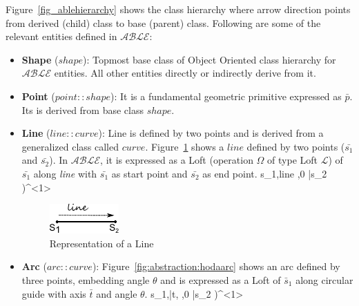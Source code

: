 Figure~\ref{fig_ablehierarchy} shows the class hierarchy where arrow direction points from derived (child) class to base (parent) class.
Following are some of the relevant entities defined in $\mathcal{ABLE}$:

\begin{itemize}[noitemsep,topsep=2pt,parsep=2pt,partopsep=2pt]

\item {\bf Shape} ($shape$): Topmost base class of Object Oriented class hierarchy for $\mathcal{ABLE}$ entities. All other entities directly or indirectly derive from it. 


\item {\bf Point} ($point::shape$): It is a fundamental geometric primitive expressed as $\bar{p}$. 	Its is derived from base class $shape$.

\item {\bf Line} ($line::curve$): Line is defined by two points and is derived from a generalized class called $curve$. Figure~\ref{fig:abstraction:hodaline} shows a $line$ defined by two points ($\bar{s_1}$ and $\bar{s_2}$). In $\mathcal{ABLE}$, it is expressed as a Loft (operation $\Omega$ of type Loft $\mathcal{L}$) of $\bar{s_1}$ along {\em line} with $\bar{s_1}$ as start point and $\bar{s_2}$ as end point.   {s_1,line ,0} {\bar{s_2} )^{<1>} }	

\smallskip

\begin{figure}[!h]
\centering 
\includegraphics[width=0.2\linewidth]{../Common/images/hodaline.pdf} 
\caption{Representation of a Line}
\label{fig:abstraction:hodaline}
\end{figure}

\smallskip



\item  {\bf Arc} ($arc::curve$):  Figure~\ref{fig:abstraction:hodaarc} shows an arc defined by three points, embedding angle $\theta$ and is expressed as a Loft of $\bar{s}_1$ along circular guide with axis $\bar{t}$ and angle $\theta$.  {s_1,\bar{t}, \theta,0} {\bar{s_2} )^{<1>}}	


\end{itemize}
